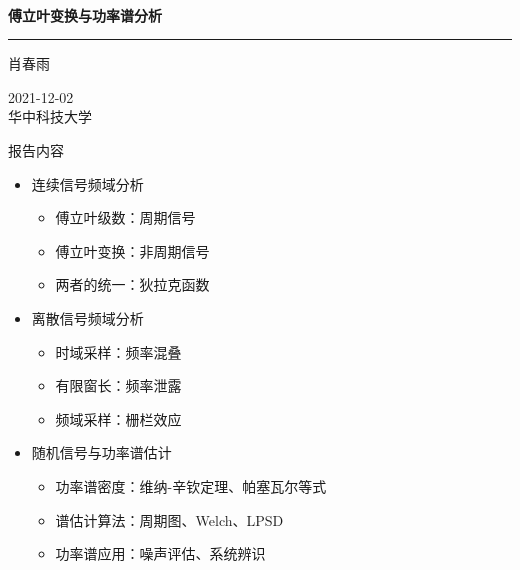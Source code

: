 \documentclass[UTF8]{ctexbeamer}
\begin{document}
    
\begin{frame}               %
    \thispagestyle{empty}
    \addtocounter{framenumber}{-1}

    \begin{center}
        \ {}
        \vspace{12mm}

        \begingroup         %
        \color{darkblue}\bfseries 傅立叶变换与功率谱分析
        \endgroup

        {\color{darkred}\rule{\textwidth}{0.7pt}}

        \vspace{3mm}

        肖春雨

        \vspace{10mm}

        2021-12-02 \\
        {\small 华中科技大学}
    \end{center}
\end{frame}



\begin{frame}{报告内容}
    \begin{itemize}
        \setlength\itemsep{7pt}
        \item[$\color{darkblue}\bullet$] {\color{darkblue} 连续信号频域分析}
        \begin{itemize}
            \item 傅立叶级数：周期信号
            \item 傅立叶变换：非周期信号
            \item 两者的统一：狄拉克函数
        \end{itemize}

        \item[$\color{darkblue}\bullet$] {\color{darkblue} 离散信号频域分析}
        \begin{itemize}
            \item 时域采样：频率混叠
            \item 有限窗长：频率泄露
            \item 频域采样：栅栏效应
        \end{itemize}

        \item[$\color{darkblue}\bullet$] {\color{darkblue} 随机信号与功率谱估计}
        \begin{itemize}
            \item 功率谱密度：维纳-辛钦定理、帕塞瓦尔等式
            \item 谱估计算法：周期图、Welch、LPSD
            \item 功率谱应用：噪声评估、系统辨识
        \end{itemize}
    \end{itemize}
\end{frame}
\end{document}
